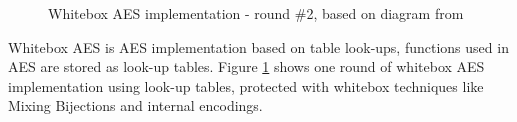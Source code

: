 \documentclass[11pt,oneside,final]{fithesis2}
\begin{document}
	\begin{figure}
	\begin{center}
	\leavevmode
	\centerline{}
	\end{center}
	\caption{Whitebox AES implementation - round \#2, based on diagram from \citep{Muir_atutorial}}
	\label{fig:wbaes}
	\end{figure}

	Whitebox AES is AES implementation based on table look-ups, functions used in AES are stored as look-up tables. Figure \ref{fig:wbaes} shows one round of whitebox AES
	implementation using look-up tables, protected with whitebox techniques like Mixing Bijections and internal encodings.
\end{document}
